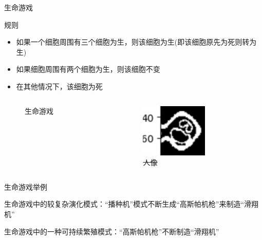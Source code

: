 \documentclass{beamer}
\begin{document}
\begin{frame}{生命游戏}
\begin{block}{规则}
    \begin{itemize}
        \item 如果一个细胞周围有三个细胞为生，则该细胞为生(即该细胞原先为死则转为生)
        \item 如果细胞周围有两个细胞为生，则该细胞不变
        \item 在其他情况下，该细胞为死
    \end{itemize}
\end{block}
    \begin{columns}[T]
    \begin{column}{0.5\textwidth}
        \begin{figure}[htpb]
            \centering
            \caption{生命游戏}
        \end{figure}
    \end{column}
    \begin{column}{0.5\textwidth}
        \begin{figure}[htpb]
            \centering
            \includegraphics[height=1.0in]{./pic/mm.jpg}
            \caption{\sout{人像}}
        \end{figure}
    \end{column}
\end{columns}
\end{frame}


\begin{frame}{生命游戏举例}
\begin{minipage}[t]{0.45\textwidth}
生命游戏中的较复杂演化模式：“播种机”模式不断生成“高斯帕机枪”来制造“滑翔机”
\end{minipage}%
\hfill
\begin{minipage}[t]{0.45\textwidth}
生命游戏中的一种可持续繁殖模式：“高斯帕机枪”不断制造“滑翔机”
\end{minipage}

\vspace{1em}

\begin{minipage}[t]{0.45\textwidth}
\centering
{}
\end{minipage}%
\hfill
\begin{minipage}[t]{0.45\textwidth}
\centering
{}
\end{minipage}

\end{frame}
\end{document}

